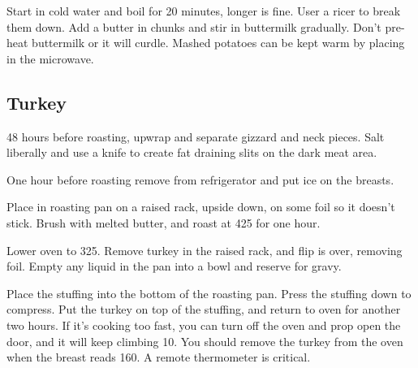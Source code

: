 \begin{recipe}


Start in cold water and boil for 20 minutes, longer is fine. User a ricer to break them down. Add a butter in chunks and stir in buttermilk gradually. Don't pre-heat buttermilk or it will curdle. Mashed potatoes can be kept warm by placing in the microwave. 

\newpage
\subsection{Turkey}



48 hours before roasting, upwrap and separate gizzard and neck pieces. Salt liberally and use a knife to create fat draining slits on the dark meat area. 

One hour before roasting remove from refrigerator and put ice on the breasts. 

Place in roasting pan on a raised rack, upside down, on some foil so it doesn't stick. Brush with melted butter, and roast at 425\degree{} for one hour.

Lower oven to 325\degree{}. Remove turkey in the raised rack, and flip is over, removing foil. Empty any liquid in the pan into a bowl and reserve for gravy.

Place the stuffing into the bottom of the roasting pan. Press the stuffing down to compress. Put the turkey on top of the stuffing, and return to oven for another two hours. If it's cooking too fast, you can turn off the oven and prop open the door, and it will keep climbing 10\degree{}. You should remove the turkey from the oven when the breast reads 160\degree{}. A remote thermometer is critical. 


\end{recipe}
